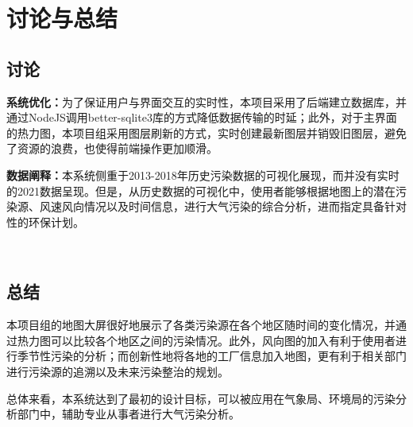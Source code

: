 \documentclass[UTF8]{ctexrep}
\begin{document}
    \section{讨论与总结}
    \subsection{讨论}
    \textbf{系统优化：}为了保证用户与界面交互的实时性，本项目采用了后端建立数据库，并通过NodeJS调用better-sqlite3库的方式降低数据传输的时延；此外，对于主界面的热力图，本项目组采用图层刷新的方式，实时创建最新图层并销毁旧图层，避免了资源的浪费，也使得前端操作更加顺滑。
    
    \textbf{数据阐释：}本系统侧重于2013-2018年历史污染数据的可视化展现，而并没有实时的2021数据呈现。但是，从历史数据的可视化中，使用者能够根据地图上的潜在污染源、风速风向情况以及时间信息，进行大气污染的综合分析，进而指定具备针对性的环保计划。
     
    ~\\ 
    \subsection{总结}
    本项目组的地图大屏很好地展示了各类污染源在各个地区随时间的变化情况，并通过热力图可以比较各个地区之间的污染情况。此外，风向图的加入有利于使用者进行季节性污染的分析；而创新性地将各地的工厂信息加入地图，更有利于相关部门进行污染源的追溯以及未来污染整治的规划。
    
    总体来看，本系统达到了最初的设计目标，可以被应用在气象局、环境局的污染分析部门中，辅助专业从事者进行大气污染分析。
\end{document}
